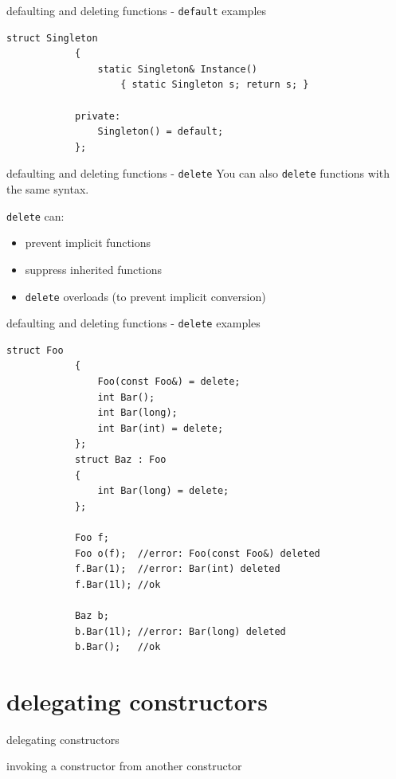 	\begin{frame}[fragile=singleslide]{defaulting and deleting functions - \lstinline|default| examples}
		\begin{lstlisting}[gobble=12]
			struct Singleton
			{
			    static Singleton& Instance()
			        { static Singleton s; return s; }
			    
			private:
			    Singleton() = default;
			};
		\end{lstlisting}
	\end{frame}
	
	\begin{frame}{defaulting and deleting functions - \lstinline|delete|}
		You can also \lstinline|delete| functions with the same syntax.
		
		\emptyline
		\lstinline|delete| can:
		\begin{itemize}
			\item prevent implicit functions
			\item suppress inherited functions
			\item \lstinline|delete| overloads (to prevent implicit conversion)
		\end{itemize}
	\end{frame}
	
	\begin{frame}[fragile=singleslide]{defaulting and deleting functions - \lstinline|delete| examples}
		\begin{lstlisting}[gobble=12]
			struct Foo
			{
			    Foo(const Foo&) = delete;
			    int Bar();
			    int Bar(long);
			    int Bar(int) = delete;
			};
			struct Baz : Foo
			{
			    int Bar(long) = delete;
			};
			
			Foo f;
			Foo o(f);  //error: Foo(const Foo&) deleted
			f.Bar(1);  //error: Bar(int) deleted
			f.Bar(1l); //ok
			
			Baz b;
			b.Bar(1l); //error: Bar(long) deleted
			b.Bar();   //ok
		\end{lstlisting}
	\end{frame}
	
	\section{delegating constructors}
	\begin{frame}
		\begin{center}
			{\Huge delegating constructors}
			
			\emptyline
			{\Large invoking a constructor from another constructor}
		\end{center}
	\end{frame}
	
